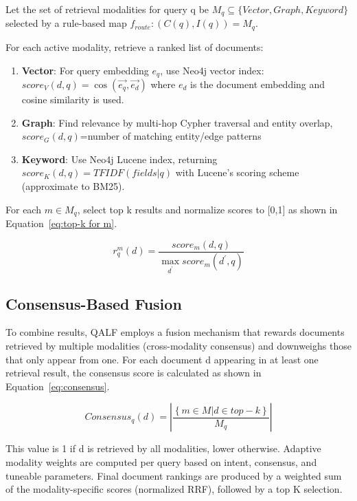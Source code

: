 \documentclass[11pt]{article}
\begin{document}
Let the set of retrieval modalities for query q be \( M_q \subseteq \{Vector,Graph,Keyword\} \) selected by a rule-based map \( f_{route}\colon (C(q),I(q))=M_q \).

For each active modality, retrieve a ranked list of documents:

\begin{enumerate}
    \item \textbf{Vector}: For query embedding \(e_q\), use Neo4j vector index:
    \(score_V(d,q)=\cos{(\vec{e_q},\vec{e_d})}\) where \(e_d\) is the document embedding and cosine similarity is used.

    \item \textbf{Graph}: Find relevance by multi-hop Cypher traversal and entity overlap, \(score_G (d,q)\)=number of matching entity/edge patterns

    \item \textbf{Keyword}: Use Neo4j Lucene index, returning \(score_K (d,q)=TFIDF(fields|q)\) with Lucene's scoring scheme (approximate to BM25).
\end{enumerate}

For each \(m\in M_q\), select top k results and normalize scores to [0,1] as shown in Equation~\ref{eq:top-k for m}.

\begin{equation}
    \label{eq:top-k for m}
    r_q^m(d)=\frac{score_m(d,q)}{\underset{d^{'}}{\max}{score_m (d^{'},q)}}
\end{equation}

\subsection{Consensus-Based Fusion}

To combine results, QALF employs a fusion mechanism that rewards documents retrieved by multiple modalities (cross-modality consensus) and downweighs those that only appear from one. For each document d appearing in at least one retrieval result, the consensus score is calculated as shown in Equation~\ref{eq:consensus}.

\begin{equation}
    \label{eq:consensus}
    Consensus_q(d)=\left| \frac{ \left\{ m\in M | d\in top-k \right\} }{M_q} \right|
\end{equation}

This value is 1 if d is retrieved by all modalities, lower otherwise. Adaptive modality weights are computed per query based on intent, consensus, and tuneable parameters. Final document rankings are produced by a weighted sum of the modality-specific scores (normalized RRF), followed by a top K selection.
\end{document}
